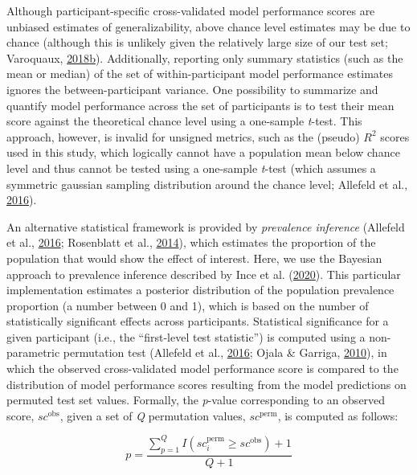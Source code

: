 \documentclass[11pt,american,a4paper,oneside,]{memoir} %
\begin{document}
Although participant-specific cross-validated model performance scores are unbiased estimates of generalizability, above chance level estimates may be due to chance (although this is unlikely given the relatively large size of our test set; Varoquaux, \protect\hyperlink{ref-Varoquaux2018-uo}{2018}\protect\hyperlink{ref-Varoquaux2018-uo}{b}). Additionally, reporting only summary statistics (such as the mean or median) of the set of within-participant model performance estimates ignores the between-participant variance. One possibility to summarize and quantify model performance across the set of participants is to test their mean score against the theoretical chance level using a one-sample \emph{t}-test. This approach, however, is invalid for unsigned metrics, such as the (pseudo) \(R^{2}\) scores used in this study, which logically cannot have a population mean below chance level and thus cannot be tested using a one-sample \emph{t}-test (which assumes a symmetric gaussian sampling distribution around the chance level; Allefeld et al., \protect\hyperlink{ref-Allefeld2016-xp}{2016}).

An alternative statistical framework is provided by \emph{prevalence inference} (Allefeld et al., \protect\hyperlink{ref-Allefeld2016-xp}{2016}; Rosenblatt et al., \protect\hyperlink{ref-Rosenblatt2014-az}{2014}), which estimates the proportion of the population that would show the effect of interest. Here, we use the Bayesian approach to prevalence inference described by Ince et al. (\protect\hyperlink{ref-Ince2020-mr}{2020}). This particular implementation estimates a posterior distribution of the population prevalence proportion (a number between 0 and 1), which is based on the number of statistically significant effects across participants. Statistical significance for a given participant (i.e., the ``first-level test statistic'') is computed using a non-parametric permutation test (Allefeld et al., \protect\hyperlink{ref-Allefeld2016-xp}{2016}; Ojala \& Garriga, \protect\hyperlink{ref-Ojala2010-rc}{2010}), in which the observed cross-validated model performance score is compared to the distribution of model performance scores resulting from the model predictions on permuted test set values. Formally, the \emph{p}-value corresponding to an observed score, \(sc^{\mathrm{obs}}\), given a set of \emph{Q} permutation values, \(sc^{\mathrm{perm}}\), is computed as follows:

\begin{equation}
p = \frac{\sum_{p=1}^{Q} I(sc_{i}^{\mathrm{perm}} \geq sc^{\mathrm{obs}}) + 1}{Q + 1}
\end{equation}
\end{document}
